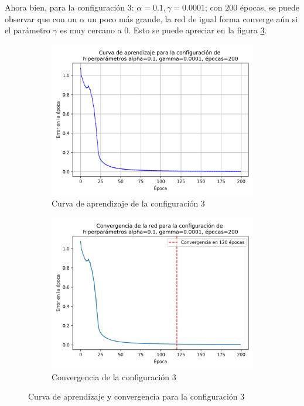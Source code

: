 \documentclass{article}
\begin{document}
Ahora bien, para la configuración 3: $\alpha=0.1, \gamma=0.0001$; con $200$ épocas, se puede observar que con un $\alpha$ un poco más grande, la red de igual forma converge aún si el parámetro $\gamma$ es muy cercano a $0$. Esto se puede apreciar en la figura \ref{fig:conf3_lr_con_xor}. 

\begin{figure}[h!]
    \centering
    \begin{subfigure}{0.49\textwidth}
        \includegraphics[width=\textwidth]{imgs/XOR/configs/curva_aprendizaje_alpha_0.1_gamma_0.0001_epochs_200.png}
        \caption{Curva de aprendizaje de la configuración 3}
        \label{fig:conf_3_xor_lr}
    \end{subfigure}
    \hfill
    \begin{subfigure}{0.49\textwidth}
        \includegraphics[width=\textwidth]{imgs/XOR/configs/convergencia_alpha_0.1_gamma_0.0001_epochs_200.png}
        \caption{Convergencia de la configuración 3}
        \label{fig:conf3_xor_con}
    \end{subfigure}
    \caption{Curva de aprendizaje y convergencia para la configuración 3}
    \label{fig:conf3_lr_con_xor}
\end{figure}
\end{document}
